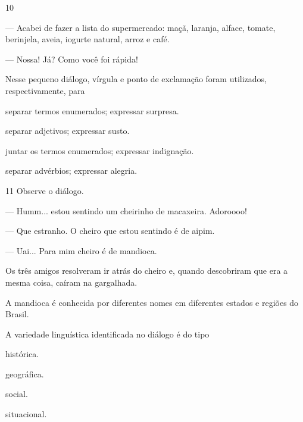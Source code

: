 \num{10}

\begin{myquote}
\textit{ }

--- Acabei de fazer a lista do supermercado: maçã, laranja, alface,
tomate, berinjela, aveia, iogurte natural, arroz e café.

--- Nossa! Já? Como você foi rápida!
\end{myquote}

Nesse pequeno diálogo, vírgula e ponto de exclamação foram utilizados,
respectivamente, para

\begin{escolha}
\item separar termos enumerados; expressar surpresa.

\item separar adjetivos; expressar susto.

\item juntar os termos enumerados; expressar indignação.

\item separar advérbios; expressar alegria.
\end{escolha}

\num{11} Observe o diálogo.

\begin{myquote}
--- Humm... estou sentindo um cheirinho de macaxeira. Adoroooo!

--- Que estranho. O cheiro que estou sentindo é de aipim.

--- Uai... Para mim cheiro é de mandioca.

Os três amigos resolveram ir atrás do cheiro e, quando descobriram que
era a mesma coisa, caíram na gargalhada.

\end{myquote}

A mandioca é conhecida por diferentes nomes em diferentes
estados e regiões do Brasil.

A variedade linguística identificada no diálogo é do tipo

\begin{escolha}
\item histórica.

\item geográfica.

\item social.

\item situacional.
\end{escolha}

